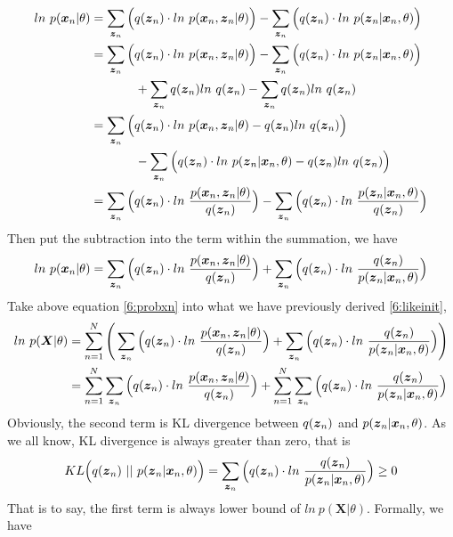 \documentclass[11pt,a4paper]{article}
\newcommand{\htab}{\hspace*{0.63cm}}
\newcommand{\dhtab}{\hspace*{1.26cm}}
\newcommand{\bs}[1]{\boldsymbol{#1}}
\begin{document}
\begin{align}
    ln\ p (\xn | \theta)
    &= \sumzn \Big( q(\zn) \cdot ln\ p (\xn, \zn | \theta) \Big) 
        - \sumzn \Big(  q(\zn) \cdot ln\ p(\zn | \xn, \theta) \Big) \\
    &= \sumzn \Big( q(\zn) \cdot ln\ p (\xn, \zn | \theta) \Big) 
        - \sumzn \Big(  q(\zn) \cdot ln\ p(\zn | \xn, \theta) \Big) \nonumber \\ 
        &\dhtab + \sumzn q(\zn) ln\ q(\zn) - \sumzn q(\zn) ln\ q(\zn) \\
    &= \sumzn \Big( q(\zn) \cdot ln\ p (\xn, \zn | \theta) - q(\zn) ln\ q(\zn) \Big) \nonumber \\
        &\dhtab - \sumzn \Big(  q(\zn) \cdot ln\ p(\zn | \xn, \theta) - q(\zn) ln\ q(\zn)\Big)  \\ 
    &=\sumzn \Big( q(\zn) \cdot ln\ \frac{p (\xn, \zn | \theta)}{q(\zn)} \Big) 
        - \sumzn \Big(  q(\zn) \cdot ln\ \frac{p(\zn | \xn, \theta)}{q(\zn)} \Big)
        \end{align}
\htab Then put the subtraction into the term within the summation, we have
\begin{align}
    ln\ p (\xn | \theta)
    = \sumzn \Big( q(\zn) \cdot ln\ \frac{p (\xn, \zn | \theta)}{q(\zn)} \Big) 
    + \sumzn \Big(  q(\zn) \cdot ln\ \frac{q(\zn)}{p(\zn | \xn, \theta)} \Big) \label{6:probxn}
    \end{align}
\htab Take above equation \eqref{6:probxn} into what we have previously derived \eqref{6:likeinit},
\begin{align}
    ln\ p(\bs{X} | \theta)
    &= \sumn \Bigg( \sumzn \Big( q(\zn) \cdot ln\ \frac{p (\xn, \zn | \theta)}{q(\zn)} \Big) 
    + \sumzn \Big(  q(\zn) \cdot ln\ \frac{q(\zn)}{p(\zn | \xn, \theta)} \Big) \Bigg) \\
    &= \sumn  \sumzn \Big( q(\zn) \cdot ln\ \frac{p (\xn, \zn | \theta)}{q(\zn)} \Big) 
    + \sumn \sumzn \Big(  q(\zn) \cdot ln\ \frac{q(\zn)}{p(\zn | \xn, \theta)} \Big) \label{6:lnJointX}
    \end{align}
\htab Obviously, the second term is KL divergence between $q(\zn)$ and $p(\zn | \xn, \theta)$.
As we all know, KL divergence is always greater than zero, that is
\begin{align}
    KL \Big(q(\zn)\ ||\ p(\zn | \xn, \theta) \Big) 
    = \sumzn \Big(  q(\zn) \cdot ln\ \frac{q(\zn)}{p(\zn | \xn, \theta)} \Big) \geq 0
    \end{align}
\htab That is to say, the first term is always lower bound of $ln\ p(\bs{X} | \theta)$. 
Formally, we have 
\end{document}
